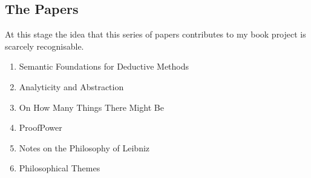 \documentclass[numreferences]{rbjk}
\begin{document}
\begin{article}
\section{The Papers}

At this stage the idea that this series of papers contributes to my book project is scarcely recognisable.

\begin{enumerate}
\item Semantic Foundations for Deductive Methods \cite{rbjp001}
\item Analyticity and Abstraction \cite{rbjp002}
\item On How Many Things There Might Be \cite{rbjp003}
\item ProofPower \cite{rbjp004}
\item Notes on the Philosophy of Leibniz \cite{rbjp005}
\item Philosophical Themes \cite{rbjp006}
\end{enumerate}


%

{\raggedright


} %

\end{article}
\end{document}
